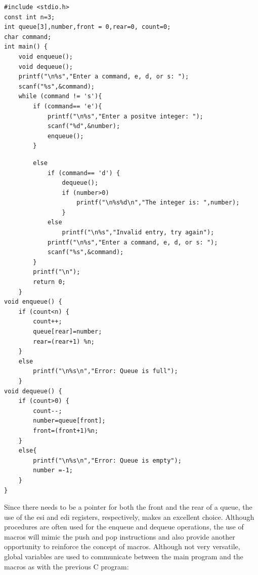 \documentclass[10pt]{article}
\begin{document}
\begin{verbatim}
#include <stdio.h>
const int n=3;
int queue[3],number,front = 0,rear=0, count=0;
char command;
int main() {
    void enqueue();
    void dequeue();
    printf("\n%s","Enter a command, e, d, or s: ");
    scanf("%s",&command);
    while (command != 's'){
        if (command== 'e'){
            printf("\n%s","Enter a positve integer: ");
            scanf("%d",&number);
            enqueue();
        }
\end{verbatim}

\begin{verbatim}
        else
            if (command== 'd') {
                dequeue();
                if (number>0)
                    printf("\n%s%d\n","The integer is: ",number);
                }
            else
                printf("\n%s","Invalid entry, try again");
            printf("\n%s","Enter a command, e, d, or s: ");
            scanf("%s",&command);
        }
        printf("\n");
        return 0;
    }
void enqueue() {
    if (count<n) {
        count++;
        queue[rear]=number;
        rear=(rear+1) %n;
    }
    else
        printf("\n%s\n","Error: Queue is full");
    }
void dequeue() {
    if (count>0) {
        count--;
        number=queue[front];
        front=(front+1)%n;
    }
    else{
        printf("\n%s\n","Error: Queue is empty");
        number =-1;
    }
}
\end{verbatim}

Since there needs to be a pointer for both the front and the rear of a queue, the use of the esi and edi registers, respectively, makes an excellent choice. Although procedures are often used for the enqueue and dequeue operations, the use of macros will mimic the push and pop instructions and also provide another opportunity to reinforce the concept of macros. Although not very versatile, global variables are used to communicate between the main program and the macros as with the previous C program:
\end{document}
